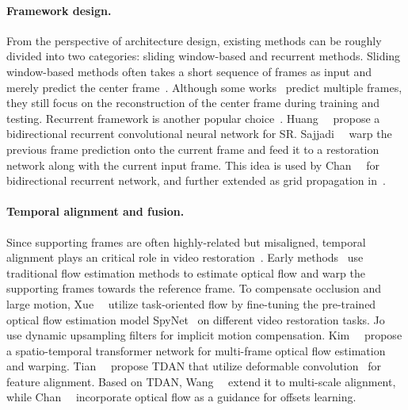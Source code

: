 \documentclass[10pt,twocolumn,letterpaper]{article}
\newlength \g
\begin{document}
\vspace{-0.4cm}
\paragraph{Framework design.}
From the perspective of architecture design, existing methods can be roughly divided into two categories: sliding window-based and recurrent methods. Sliding window-based methods often takes a short sequence of frames as input and merely predict the center frame~\cite{caballero2017VESPCN, huang2017video, wang2019edvr, tassano2019dvdnet, tian2020tdan, li2020mucan, su2017dvddeblur, zhou2019spatio, isobe2020tga,tassano2020fastdvdnet, sheth2021unsupervised, li2021arvo}. Although some works~\cite{li2019fast} predict multiple frames, they still focus on the reconstruction of the center frame during training and testing. Recurrent framework is another popular choice~\cite{huang2015bidirectional, sajjadi2018FRVSR, fuoli2019rlsp, haris2019recurrent, isobe2020rsdn, isobe2020rrn, chan2021basicvsr, chan2021basicvsr++, lin2021fdan, nah2019recurrent, zhong2020efficient, son2021recurrent}. Huang~\etal~\cite{huang2015bidirectional} propose a bidirectional recurrent convolutional neural network for SR. Sajjadi~\etal~\cite{sajjadi2018FRVSR} warp the previous frame prediction onto the current frame and feed it to a restoration network along with the current input frame. This idea is used by Chan~\etal~\cite{chan2021basicvsr} for bidirectional recurrent network, and further extended as grid propagation in~\cite{chan2021basicvsr++}. 

\vspace{-0.4cm}
\paragraph{Temporal alignment and fusion.}
Since supporting frames are often highly-related but misaligned, temporal alignment plays an critical role in video restoration~\cite{liao2015video, xue2019TOFlow-Vimeo-90K, tian2020tdan, wang2019edvr, chan2021understanding, chan2021basicvsr, chan2021basicvsr++}. Early methods~\cite{liao2015video, kappeler2016video, caballero2017VESPCN, liu2017robust, tao2017detail} use traditional flow estimation methods to estimate optical flow and warp the supporting frames towards the reference frame. To compensate occlusion and large motion, Xue~\etal~\cite{xue2019TOFlow-Vimeo-90K} utilize task-oriented flow by fine-tuning the pre-trained optical flow estimation model SpyNet~\cite{ranjan2017spynet} on different video restoration tasks. Jo~\etal~\cite{jo2018DUF} use dynamic upsampling filters for implicit motion compensation. Kim~\etal~\cite{kim2018spatio} propose a spatio-temporal transformer network for multi-frame optical flow estimation and warping. Tian~\etal~\cite{tian2020tdan} propose TDAN that utilize deformable convolution~\cite{dai2017deformable} for feature alignment. Based on TDAN, Wang~\etal~\cite{wang2019edvr} extend it to multi-scale alignment, while Chan~\etal~\cite{chan2021basicvsr++} incorporate optical flow as a guidance for offsets learning. 
\end{document}
